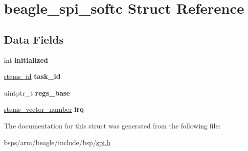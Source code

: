 \hypertarget{structbeagle__spi__softc}{}\section{beagle\+\_\+spi\+\_\+softc Struct Reference}
\label{structbeagle__spi__softc}
\subsection*{Data Fields}
\begin{DoxyCompactItemize}
\item 
\mbox{\label{structbeagle__spi__softc_ab4dc1b19478a578da5d2134d1175de5b}} 
int {\bfseries initialized}
\item 
\mbox{\label{structbeagle__spi__softc_a57c8c3a42b7be472b38b2110da33a0a7}} 
\mbox{\hyperlink{group__ClassicTasks_gab20892b814dced7dd4e5b9bf42becd57}{rtems\+\_\+id}} {\bfseries task\+\_\+id}
\item 
\mbox{\label{structbeagle__spi__softc_a31634a6d1328a7cdc57d0a7b74c226a6}} 
uintptr\+\_\+t {\bfseries regs\+\_\+base}
\item 
\mbox{\label{structbeagle__spi__softc_a7aa64bde5cf6d8b80fd8a6ebcc230344}} 
\mbox{\hyperlink{group__ClassicINTR_ga3e434c197d99f128e78cae4d9358bd8b}{rtems\+\_\+vector\+\_\+number}} {\bfseries irq}
\end{DoxyCompactItemize}


The documentation for this struct was generated from the following file\+:\begin{DoxyCompactItemize}
\item 
bsps/arm/beagle/include/bsp/\mbox{\hyperlink{bsps_2arm_2beagle_2include_2bsp_2spi_8h}{spi.\+h}}\end{DoxyCompactItemize}
